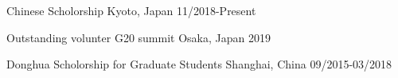 

\begin{cvhonors}

  \cvhonor
    {Chinese Scholorship} %
    {} %
    {Kyoto, Japan} %
    {11/2018-Present} %

  \cvhonor
    {Outstanding volunter} %
    {G20 summit} %
    {Osaka, Japan} %
    {2019} %

  \cvhonor
    {Donghua Scholorship for Graduate Students} %
    {} %
    {Shanghai, China} %
    {09/2015-03/2018} %

\end{cvhonors}


